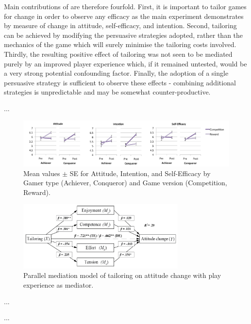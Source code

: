 \documentclass[11pt]{article}
\begin{document}
Main contributions of \citet{orji2017} are therefore fourfold. First, it is important to tailor games for change in order to observe any efficacy as the main experiment demonstrates by measure of change in attitude, self-efficacy, and intention. Second, tailoring can be achieved by modifying the persuasive strategies adopted, rather than the mechanics of the game which will surely minimise the tailoring costs involved. 
Thirdly, the resulting positive effect of tailoring was not seen to be mediated purely by an improved player experience which, if it remained untested, would be a very strong potential confounding factor. Finally, the adoption of a single persuasive strategy is sufficient to observe these effects - combining additional strategies is unpredictable and may be somewhat counter-productive.

...

\begin{figure}[H]
\centering
\includegraphics[width=\textwidth]{img/orji2017-tailoring-results.png} 
\caption{Mean values $\pm$ SE for Attitude, Intention, and Self-Efficacy by Gamer type (Achiever, Conqueror) and Game version (Competition, Reward).}\label{fig:orji2017-tailoring-results}
\end{figure}

\begin{figure}[H]
\centering
\includegraphics[width=0.75\textwidth]{img/orji2017-tailoring-mediation-results.png} 
\caption{Parallel mediation model of tailoring on attitude change with play experience as mediator.}\label{fig:orji2017-tailoring-mediation-results}
\end{figure}

...

...


\newpage
\small

\normalsize
\end{document}
